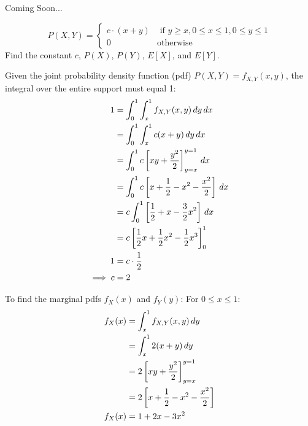 \documentclass[a4paper, 10pt]{article}
\begin{document}
\begin{solution}
Coming Soon...
\end{solution}

\newpage

\begin{tosubmit}
\problem[16]
\[
    P(X, Y) = \begin{cases}
        c \cdot (x+y) & \text{ if } y \geq x, 0 \leq x \leq 1, 0 \leq y \leq 1 \\
        0 & \text{otherwise}
    \end{cases}
\]
Find the constant \( c \), \( P(X) \), \( P(Y) \), \( E[X] \), and \( E[Y] \).

\par\noindent\submitsolution
Given the joint probability density function (pdf) \( P(X, Y) = f_{X,Y}(x, y) \), the integral over the entire support must equal 1:
\begin{align*}
    1 &= \int_0^1 \int_x^1 f_{X,Y}(x, y) \, dy \, dx \\
    &= \int_0^1 \int_x^1 c(x + y) \, dy \, dx \\
    &= \int_0^1 c \left[xy + \frac{y^2}{2}\right]_{y=x}^{y=1} \, dx \\
    &= \int_0^1 c \left[x + \frac{1}{2} - x^2 - \frac{x^2}{2}\right] \, dx \\
    &= c \int_0^1 \left[\frac{1}{2} + x - \frac{3}{2}x^2\right] \, dx \\
    &= c \left[\frac{1}{2}x + \frac{1}{2}x^2 - \frac{1}{2}x^3\right]_{0}^{1} \\
    1 &= c \cdot \frac{1}{2} \\
    \implies c &= 2
\end{align*}

To find the marginal pdfs \( f_X(x) \) and \( f_Y(y) \): \newline
For \( 0 \leq x \leq 1 \):
\begin{align*}
    f_X(x) &= \int_x^1 f_{X,Y}(x, y) \, dy \\
    &= \int_x^1 2(x + y) \, dy \\
    &= 2 \left[xy + \frac{y^2}{2}\right]_{y=x}^{y=1} \\
    &= 2 \left[x + \frac{1}{2} - x^2 - \frac{x^2}{2}\right] \\
    f_X(x) &= 1 + 2x - 3x^2
\end{align*}


\end{tosubmit}
\end{document}
